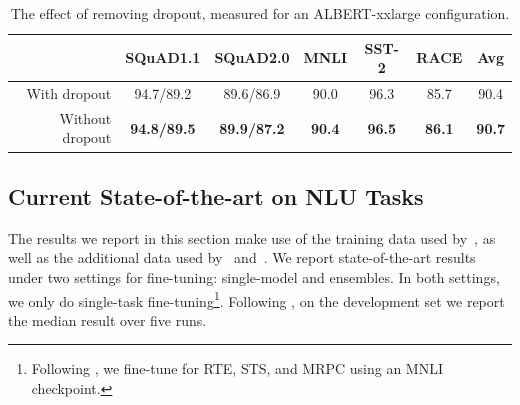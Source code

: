 \begin{table}[!htbp] 
\small
\centering
\begin{tabular}{ r |  c c c c c | c }
&SQuAD1.1	&SQuAD2.0	&MNLI	&SST-2	&RACE & Avg \\
\hline
With dropout     &94.7/89.2	&89.6/86.9	&90.0	&96.3	&85.7	&90.4\\
Without dropout  &\textbf{94.8/89.5}	 &\textbf{89.9/87.2}	&\textbf{90.4}	&\textbf{96.5}	&\textbf{86.1}	&\textbf{90.7}\\
\end{tabular}
\caption{The effect of removing dropout, measured for an ALBERT-xxlarge configuration.}
\label{table:removing_dropout}
\end{table}


\vspace{-5pt}

\subsection{Current State-of-the-art on NLU Tasks}

The results we report in this section make use of the training data used by~\cite{devlin2018bert}, as well as the additional data used by~\cite{liu2019roberta} and~\cite{yang2019xlnet}. 
We report state-of-the-art results under two settings for fine-tuning: single-model and ensembles.
In both settings, we only do single-task fine-tuning\footnote{Following \cite{liu2019roberta}, we fine-tune for RTE, STS, and MRPC using an MNLI checkpoint.}.
Following \cite{liu2019roberta}, on the development set we report the median result over five runs.



